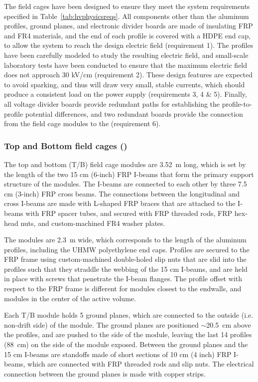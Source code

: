 The field cages have been designed to ensure they meet the system requirements specified in Table~\ref{tab:hvphysicsreqs}. All components other than the aluminum profiles, ground planes, and electronic divider boards are made of insulating FRP and FR4 materials, and the end of each profile is covered with a HDPE end cap, to allow the system to reach the design  electric field (requirement 1). The profiles have been carefully modeled to study the resulting electric field, and small-scale laboratory tests have been conducted to ensure that the maximum electric field does not approach 30 kV/cm (requirement 2). These design features are expected to avoid sparking, and thus will draw very small, stable currents, which should produce a consistent load on the power supply (requirements 3, 4 \& 5). Finally, all voltage divider boards provide redundant paths for establishing the profile-to-profile potential differences, and two redundant boards provide the connection from the field cage modules to the  (requirement 6).

\subsubsection{Top and Bottom field cages ()}

The top and bottom (T/B) field cage modules are 3.52~m long, which is set by the length of the two 15 cm (6-inch) FRP I-beams that form the primary support structure of the modules. The I-beams are connected to each other by three  7.5 cm (3-inch) FRP cross beams. The connections between the longitudinal and cross I-beams are made with L-shaped FRP braces that are attached to the I-beams with FRP spacer tubes, and secured with FRP threaded rods, FRP hex-head nuts, and custom-machined FR4 washer plates.

The modules are 2.3~m wide, which corresponds to the length of the aluminum profiles, including the UHMW polyethylene end caps. Profiles are secured to the FRP frame using custom-machined double-holed slip nuts that are slid into the profiles such that they straddle the webbing of the 15 cm I-beams, and are held in place with screws that penetrate the I-beam flanges. The profile offset with respect to the FRP frame is different for modules closest to the endwalls, and modules in the center of the active volume.

Each T/B module holds 5 ground planes, which are connected to the outside (i.e. non-drift side) of the module. The ground planes are positioned $\sim$20.5~cm above the profiles, and are pushed to the  side of the module, leaving the last 14 profiles (88~cm) on the  side of the module exposed. Between the ground planes and the 15 cm I-beams are standoffs made of short sections of 10 cm (4 inch)  FRP I-beams, which are connected with FRP threaded rods and slip nuts. The electrical connection between the ground planes is made with copper strips.

